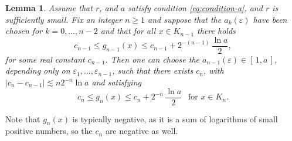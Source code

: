 \documentclass[10pt]{amsart}
\numberwithin{equation}{section}
\theoremstyle{plain}
\newtheorem{lem}{Lemma}[section]
\theoremstyle{definition}
\begin{document}
\begin{lem}\label{mainLemma}
Assume that $r$, and $a$ satisfy condition \eqref{eq:condition-a}, and $r$ is sufficiently small.
Fix an integer $n\ge 1$ and suppose that the $a_k(\varepsilon)$ have been chosen for $k= 0,\dots, n-2$
and that for all $x \in K_{n-1}$ there holds
\begin{equation}\label{eq:iter-step-n-1}
c_{n-1} \le g_{n-1}(x) \le c_{n-1} + 2^{-(n-1)}\, \dfrac{\ln a}{2},
\end{equation}
for some real constant $c_{n-1}$. Then one can choose the $a_{n-1}(\varepsilon)\in [\,1,a\,]$,
depending only on $\varepsilon_1, \dotsc, \varepsilon_{n-1}$, such that there exists $c_n$,
with $|c_n-c_{n-1}| \lesssim n 2^{-n}\ln a$ and satisfying
\begin{equation}\label{eq:iter-step-n}
c_n \le g_n (x) \le c_n + 2^{-n}\, \dfrac{\ln a}{2}
\ \ \text{ for $x\in K_n$.}
\end{equation}
\end{lem}
Note that $g_n(x)$ is typically negative, as it is a sum of logarithms of small positive numbers, so the $c_n$ are negative as well.
\end{document}
